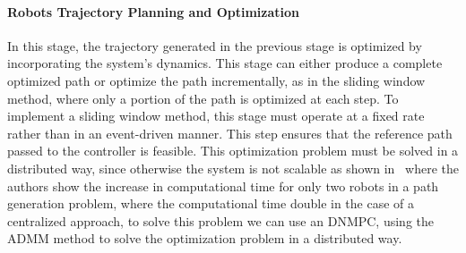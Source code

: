 \paragraph{Robots Trajectory Planning and Optimization} 
In this stage, the trajectory generated in the previous stage is optimized by incorporating the system's dynamics. This stage can either produce a complete optimized path or optimize the path incrementally, as in the sliding window method, where only a portion of the path is optimized at each step. To implement a sliding window method, this stage must operate at a fixed rate rather than in an event-driven manner. This step ensures that the reference path passed to the controller is feasible. This optimization problem must be solved in a distributed way, since otherwise the system is not scalable as shown in~\cite{9429795} where the authors show the increase in computational time for only two robots in a path generation problem, where the computational time double in the case of a centralized approach, to solve this problem we can use an DNMPC, using the ADMM method to solve the optimization problem in a distributed way.

